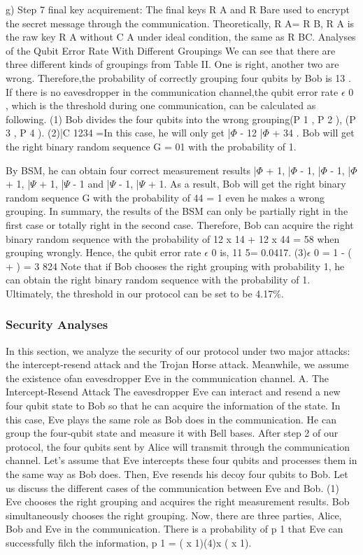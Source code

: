 g) Step 7 final key acquirement: The final keys R A and R Bare used to encrypt the secret message through the communication. Theoretically, R A= R B, R A is the raw key R A without C A under ideal condition, the same as R BC. Analyses of the Qubit Error Rate With Different Groupings We can see that there are three different kinds of groupings from Table II. One is right, another two are wrong. Therefore,the probability of correctly grouping four qubits by Bob is 13 .
If there is no eavesdropper in the communication channel,the qubit error rate $\epsilon$ 0 , which is the threshold during one communication, can be calculated as following.
(1) Bob divides the four qubits into the wrong grouping{(P 1 , P 2 ), (P 3 , P 4 )}.
(2)|C 1234 =In this case, he will only get |$\Phi$ -  12 |$\Phi$ +  34 . Bob will get the right binary random sequence G = 01 with the probability of 1.

By BSM, he can obtain four correct measurement results {|$\Phi$ + 1, |$\Phi$ - 1}, {|$\Phi$ - 1, |$\Phi$ + 1}, {|$\Psi$ + 1, |$\Psi$ - 1} and {|$\Psi$ - 1, |$\Psi$ + 1}. As a result, Bob will get the right binary random sequence G with the probability of 44 = 1 even he makes a wrong grouping.
In summary, the results of the BSM can only be partially right in the first case or totally right in the second case.
Therefore, Bob can acquire the right binary random sequence with the probability of 12 x 14 + 12 x 44 = 58 when grouping wrongly. Hence, the qubit error rate $\epsilon$ 0 is, 11 5= 0.0417. (3)$\epsilon$ 0 = 1 - ( + ) = 3 824
Note that if Bob chooses the right grouping with probability 1, he can obtain the right binary random sequence with the probability of 1. Ultimately, the threshold in our protocol can be set to be 4.17\%.

\subsubsection{Security Analyses}
In this section, we analyze the security of our protocol under two major attacks: the intercept-resend attack and the Trojan Horse attack. Meanwhile, we assume the existence ofan eavesdropper Eve in the communication channel.
A. The Intercept-Resend Attack The eavesdropper Eve can interact and resend a new four qubit state to Bob so that he can acquire the information of the state. In this case, Eve plays the same role as Bob does in the communication. He can group the four-qubit state and measure it with Bell bases.
After step 2 of our protocol, the four qubits sent by Alice will transmit through the communication channel. Let’s assume that Eve intercepts these four qubits and processes them in the same way as Bob does. Then, Eve resends his decoy four qubits to Bob. Let us discuss the different cases of the communication between Eve and Bob.
(1) Eve chooses the right grouping and acquires the right measurement results. Bob simultaneously chooses the right grouping. Now, there are three parties, Alice, Bob and Eve in the communication. There is a probability of p 1 that Eve can successfully filch the information, p 1 = ( x 1)(4)x ( x 1).

